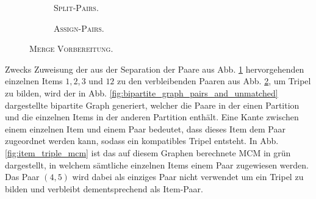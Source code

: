 \begin{figure}[H]
\centering
\begin{subfigure}[b]{\textwidth}
\centering
{}
\caption{\textsc{Split-Pairs}.}
\label{fig:split_pairs}
\end{subfigure}
\begin{subfigure}[b]{\textwidth}
\centering
{}
\caption{\textsc{Assign-Pairs}.}
\label{fig:assign_pairs}
\end{subfigure}
\caption{\textsc{Merge Vorbereitung}.}
\label{fig:pre_merge_step}
\end{figure}

Zwecks Zuweisung der aus der Separation der Paare aus Abb. \ref{fig:split_pairs} hervorgehenden einzelnen Items $1, 2, 3$ und $12$
zu den verbleibenden Paaren aus Abb. \ref{fig:assign_pairs}, um Tripel zu bilden, wird der in Abb.
\ref{fig:bipartite_graph_pairs_and_unmatched} dargestellte bipartite Graph generiert, welcher die Paare in der einen Partition
und die einzelnen Items in der anderen Partition enthält. Eine Kante zwischen einem einzelnen Item und einem Paar bedeutet,
dass dieses Item dem Paar zugeordnet werden kann, sodass ein kompatibles Tripel entsteht.
In Abb. \ref{fig:item_triple_mcm} ist das auf diesem Graphen berechnete \textsc{MCM} in grün dargestellt, in welchem
sämtliche einzelnen Items einem Paar zugewiesen werden. Das Paar $(4, 5)$ wird dabei als einziges Paar nicht verwendet
um ein Tripel zu bilden und verbleibt dementsprechend als Item-Paar.

\vfill

\pagebreak

